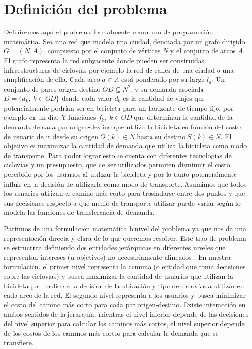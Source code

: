 \chapter{Definición del problema}
\label{sect:problemdefinition}

Definiremos aquí el problema formalmente como uno de programación matemática. Sea una red que modela una ciudad, denotada por un grafo dirigido $G=(N,A)$, compuesto por el conjunto de vértices $N$ y el conjunto de arcos $A$. El grafo representa la red subyacente donde pueden ser construidas infraestructuras de ciclovías por ejemplo la red de calles de una ciudad o una simplificación de ella. Cada arco $a \in A$ está ponderado por su largo $l_a$. Un conjunto de pares origen-destino $OD \subseteq N^2$, y su demanda asociada $D = \{d_k,\; k \in OD\}$ donde cada valor $d_k$ es la cantidad de viajes que potencialmente podrían ser en bicicleta para un horizonte de tiempo fijo, por ejemplo en un día. Y funciones $f_k,\;k \in OD$ que determinan la cantidad de la demanda de cada par origen-destino que utiliza la bicicleta en función del costo de usuario de ir desde su origen $O(k) \in N$ hasta su destino $S(k) \in N$. El objetivo es maximizar la cantidad de demanda que utiliza la bicicleta como modo de transporte. Para poder lograr esto se cuenta con diferentes tecnologías de ciclovías y un presupuesto, que de ser utilizados permiten disminuir el costo percibido por los usuarios al utilizar la bicicleta y por lo tanto potencialmente influir en la decisión de utilizarla como modo de transporte. Asumimos que todos los usuarios utilizan el camino más corto para trasladarse entre dos puntos y que sus decisiones respecto a qué medio de transporte utilizar puede variar según lo modela las funciones de transferencia de demanda.

Partimos de una formulación matemática binivel del problema ya que nos da una representación directa y clara de lo que queremos resolver. Este tipo de problema se estructura definiendo dos entidades jerárquicas en diferentes niveles que representan intereses (u objetivos) no necesariamente alineados \citep{bardbook}. En nuestra formulación, el primer nivel representa la comuna (o entidad que toma decisiones sobre las ciclovías) y busca maximizar la cantidad de usuarios que utilizan la bicicleta por medio de la decisión de la ubicación y tipo de ciclovías a utilizar en cada arco de la red. El segundo nivel representa a los usuarios y busca minimizar el costo del camino más corto para cada par origen-destino. Existe interacción en ambos sentidos de la jerarquía, mientras el nivel inferior depende de las decisiones del nivel superior para calcular los caminos más cortos, el nivel superior depende de los costos de los caminos más cortos para calcular la demanda que se transfiere.


